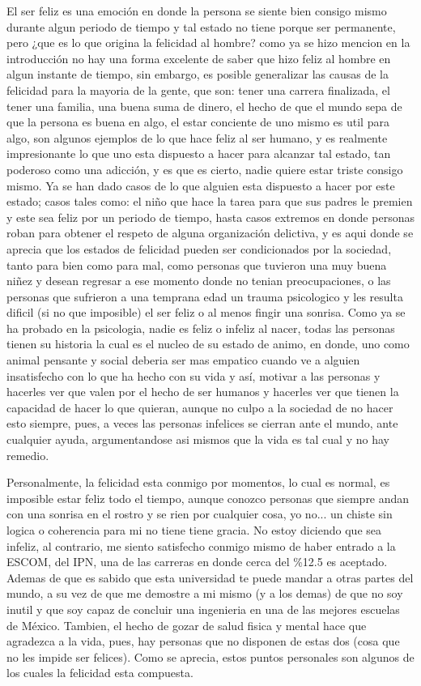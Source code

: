 \documentclass[12pt,letterpaper]{article}
\begin{document}
	El ser feliz es una emoción en donde la persona se siente bien consigo mismo durante algun periodo de tiempo y tal estado no tiene porque ser permanente, pero ¿que es lo que origina la felicidad al hombre? como ya se hizo mencion en la introducción no hay una forma excelente de saber que hizo feliz al hombre en algun instante de tiempo, sin embargo, es posible generalizar las causas de la felicidad para la mayoria de la gente, que son: tener una carrera finalizada, el tener una familia, una buena suma de dinero, el hecho de que el mundo sepa de que la persona es buena en algo, el estar conciente de uno mismo es util para algo, son algunos ejemplos de lo que hace feliz al ser humano, y es realmente impresionante lo que uno esta dispuesto a hacer para alcanzar tal estado, tan poderoso como una adicción, y es que es cierto, nadie quiere estar triste consigo mismo. Ya se han dado casos de lo que alguien esta dispuesto a hacer por este estado; casos tales como: el niño que hace la tarea para que sus padres le premien y este sea feliz por un periodo de tiempo, hasta casos extremos en donde personas roban para obtener el respeto de alguna organización delictiva, y es aqui donde se aprecia que los estados de felicidad pueden ser condicionados por la sociedad, tanto para bien como para mal, como personas que tuvieron una muy buena niñez y desean regresar a ese momento donde no tenian preocupaciones, o las personas que sufrieron a una temprana edad un trauma psicologico y les resulta dificil (si no que imposible) el ser feliz o al menos fingir una sonrisa. Como ya se ha probado en la psicologia, nadie es feliz o infeliz al nacer, todas las personas tienen su historia la cual es el nucleo de su estado de animo, en donde, uno como animal pensante y social deberia ser mas empatico cuando ve a alguien insatisfecho con lo que ha hecho con su vida y así, motivar a las personas y hacerles ver que valen por el hecho de ser humanos y hacerles ver que tienen la capacidad de hacer lo que quieran, aunque no culpo a la sociedad de no hacer esto siempre, pues, a veces las personas infelices se cierran ante el mundo, ante cualquier ayuda, argumentandose asi mismos que la vida es tal cual y no hay remedio.

	

	Personalmente, la felicidad esta conmigo por momentos, lo cual es normal, es imposible estar feliz todo el tiempo, aunque conozco personas que siempre andan con una sonrisa en el rostro y se rien por cualquier cosa, yo no... un chiste sin logica o coherencia para mi no tiene tiene gracia. No estoy diciendo que sea infeliz, al contrario, me siento satisfecho conmigo mismo de haber entrado a la ESCOM, del IPN, una de las carreras en donde cerca del \%12.5 es aceptado. Ademas de que es sabido que esta universidad te puede mandar a otras partes del mundo, a su vez de que me demostre a mi mismo (y a los demas) de que no soy inutil y que soy capaz de concluir una ingenieria en una de las mejores escuelas de México. Tambien, el hecho de gozar de salud fisica y mental hace que agradezca a la vida, pues, hay personas que no disponen de estas dos (cosa que no les impide ser felices). Como se aprecia, estos puntos personales son algunos de los cuales la felicidad esta compuesta.
\end{document}
